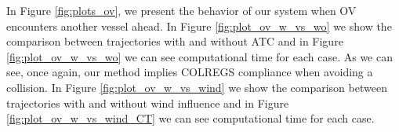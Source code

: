         
        In Figure \ref{fig:plots_ov}, we present the behavior of our system when \ac{OV} encounters another vessel ahead. 
        In Figure \ref{fig:plot_ov_w_vs_wo} we show the comparison between trajectories with and without ATC and in Figure \ref{fig:plot_ov_w_vs_wo} we can see computational time for each case. As we can see, once again, our method implies COLREGS compliance when avoiding a collision. In Figure \ref{fig:plot_ov_w_vs_wind} we show the comparison between trajectories with and without wind influence and in Figure \ref{fig:plot_ov_w_vs_wind_CT} we can see computational time for each case. 
